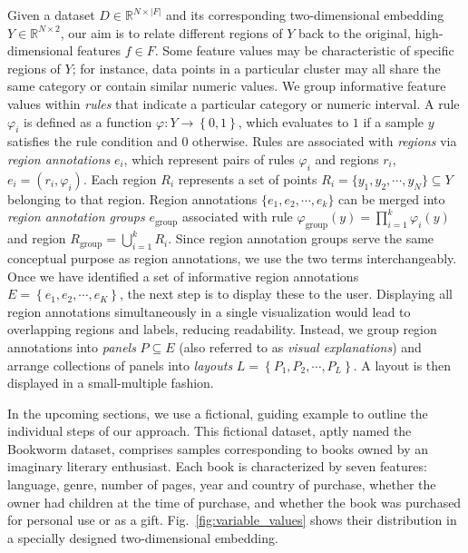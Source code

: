 \documentclass[lettersize,journal]{IEEEtran}
\begin{document}
Given a dataset $D \in \mathbb{R}^{N \times |F|}$ and its corresponding two-dimensional embedding $Y \in \mathbb{R}^{N \times 2}$, our aim is to relate different regions of $Y$ back to the original, high-dimensional features $f \in F$.
Some feature values may be characteristic of specific regions of $Y$; for instance, data points in a particular cluster may all share the same category or contain similar numeric values.
We group informative feature values within \textit{rules} that indicate a particular category or numeric interval.
A rule $\varphi_i$ is defined as a function $\varphi: Y \rightarrow \left \{ 0, 1
\right \} $, which evaluates to $1$ if a sample $y$ satisfies the rule condition and $0$ otherwise.
Rules are associated with \textit{regions} via \textit{region annotations} $e_i$, which represent pairs of rules $\varphi_i$ and regions $r_i$, $e_i = \left ( r_i, \varphi_i \right )$.
Each region $R_i$ represents a set of points $R_i = \{ y_1, y_2, \cdots, y_N \} \subseteq Y$ belonging to that region.
Region annotations $\{ e_1, e_2, \cdots, e_k \}$ can be merged into \textit{region annotation groups} $e_{\text{group}}$ associated with rule $\varphi_{\text{group}}(y) = \prod_{i=1}^k \varphi_i(y)$ and region $R_{\text{group}} = \bigcup_{i=1}^{k} R_i$. Since region annotation groups serve the same conceptual purpose as region annotations, we use the two terms interchangeably.
Once we have identified a set of informative region annotations $E = \left \{ e_1, e_2, \cdots, e_K \right \}$, the next step is to display these to the user. Displaying all region annotations simultaneously in a single visualization would lead to overlapping regions and labels, reducing readability.
Instead, we group region annotations into \textit{panels} $P \subseteq E$ (also referred to as \textit{visual explanations}) and arrange collections of panels into \textit{layouts} $L = \left \{ P_1, P_2, \cdots, P_L \right \}$. A layout is then displayed in a small-multiple fashion.

In the upcoming sections, we use a fictional, guiding example to outline the individual steps of our approach.
This fictional dataset, aptly named the Bookworm dataset, comprises samples corresponding to books owned by an imaginary literary enthusiast. Each book is characterized by seven features: language, genre, number of pages, year and country of purchase, whether the owner had children at the time of purchase, and whether the book was purchased for personal use or as a gift.
Fig.~\ref{fig:variable_values} shows their distribution in a specially designed two-dimensional embedding.
\end{document}
